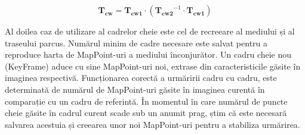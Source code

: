 \documentclass[12pt,a4paper]{report}
\begin{document}
\begin{equation}
\mathbf{T_{cw}} = \mathbf{T_{cw1}} \cdot \left( \mathbf{T_{cw2}}^{-1} \cdot \mathbf{T_{cw1}} \right)
\end{equation} 

Al doilea caz de utilizare al cadrelor cheie este cel de recreeare al mediului și al traseului parcus.
Numărul minim de cadre necesare este salvat pentru a reproduce harta de MapPoint-uri a mediului
înconjurător. Un cadru cheie nou (KeyFrame) aduce cu sine MapPoint-uri noi, extrase din caracteristicile
găsite în imaginea respectivă. Funcționarea corectă a urmăririi cadru cu cadru, este determinată de numărul de 
MapPoint-uri găsite în imaginea curentă în comparație cu un cadru de referintă. În momentul 
în care numărul de puncte cheie găsite în cadrul curent scade sub un anumit prag, știm că este
necesară salvarea acestuia și creearea unor noi MapPoint-uri pentru a stabiliza urmărirea. 
\end{document}
